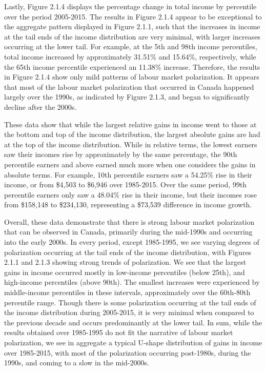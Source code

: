 \documentclass[undefended]{bumrp}
\begin{document}
Lastly, Figure 2.1.4 displays the percentage change in total income by percentile over the period 2005-2015. The results in Figure 2.1.4 appear to be exceptional to the aggregate pattern displayed in Figure 2.1.1, such that the increases in income at the tail ends of the income distribution are very minimal, with larger increases occurring at the lower tail. For example, at the 5th and 98th income percentiles, total income increased by approximately 31.51\% and 15.64\%, respectively, while the 65th income percentile experienced an 11.38\% increase. Therefore, the results in Figure 2.1.4 show only mild patterns of labour market polarization. It appears that most of the labour market polarization that occurred in Canada happened largely over the 1990s, as indicated by Figure 2.1.3, and began to significantly decline after the 2000s.

These data show that while the largest relative gains in income went to those at the bottom and top of the income distribution, the largest absolute gains are had at the top of the income distribution. While in relative terms, the lowest earners saw their incomes rise by approximately by the same percentage, the 90th percentile earners and above earned much more when one considers the gains in absolute terms. For example, 10th percentile earners saw a 54.25\% rise in their income, or from \$4,503 to \$6,946 over 1985-2015. Over the same period, 99th percentile earners only saw a 48.04\% rise in their income, but their incomes rose from \$158,148 to \$234,130, representing a \$73,539 difference in income growth.

Overall, these data demonstrate that there is strong labour market polarization that can be observed in Canada, primarily during the mid-1990s and occurring into the early 2000s. In every period, except 1985-1995, we see varying degrees of polarization occurring at the tail ends of the income distribution, with Figures 2.1.1 and 2.1.3 showing strong trends of polarization. We see that the largest gains in income occurred mostly in low-income percentiles (below 25th), and high-income percentiles (above 90th). The smallest increases were experienced by middle-income percentiles in these intervals, approximately over the 60th-80th percentile range. Though there is some polarization occurring at the tail ends of the income distribution during 2005-2015, it is very minimal when compared to the previous decade and occurs predominantly at the lower tail. In sum, while the results obtained over 1985-1995 do not fit the narrative of labour market polarization, we see in aggregate a typical U-shape distribution of gains in income over 1985-2015, with most of the polarization occurring post-1980s, during the 1990s, and coming to a slow in the mid-2000s.
\end{document}
